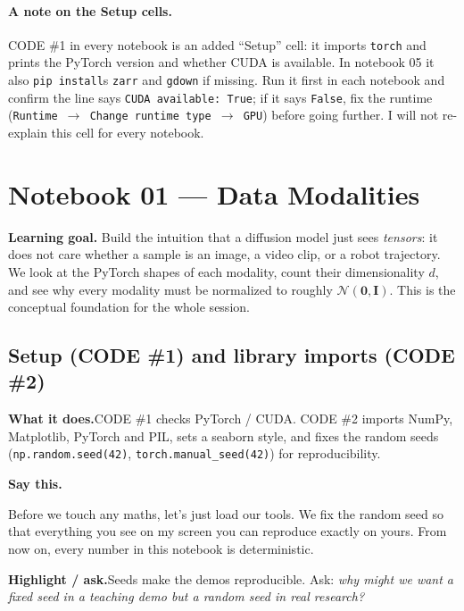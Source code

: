 \documentclass[11pt]{article}
\newenvironment{saythis}{%
  \par\smallskip\noindent
  \begin{list}{}{%
    \setlength{\leftmargin}{1.2em}%
    \setlength{\rightmargin}{0.5em}%
    \setlength{\topsep}{2pt}%
  }\item\relax
  \color{sayrule}\textbf{Say this.}\hspace{0.4em}\color{black}\itshape
}{%
  \end{list}\par\smallskip
}
\newcommand{\highlight}[1]{\par\smallskip\noindent\textcolor{hlcolor}{\textbf{Highlight / ask.}}\hspace{0.4em}#1\par\smallskip}
\newcommand{\whatdoes}[1]{\par\noindent\textbf{What it does.}\hspace{0.4em}#1\par}
\begin{document}
\paragraph{A note on the Setup cells.} CODE \#1 in every notebook is an added ``Setup'' cell:
it imports \texttt{torch} and prints the PyTorch version and whether CUDA is available. In notebook
05 it also \texttt{pip install}s \texttt{zarr} and \texttt{gdown} if missing. Run it first in each
notebook and confirm the line says \texttt{CUDA available: True}; if it says \texttt{False}, fix the
runtime (\texttt{Runtime $\to$ Change runtime type $\to$ GPU}) before going further. I will not
re-explain this cell for every notebook.

\section{Notebook 01 --- Data Modalities}

\textbf{Learning goal.} Build the intuition that a diffusion model just sees \emph{tensors}: it does
not care whether a sample is an image, a video clip, or a robot trajectory. We look at the PyTorch
shapes of each modality, count their dimensionality $d$, and see why every modality must be
normalized to roughly $\mathcal{N}(\mathbf{0}, \mathbf{I})$. This is the conceptual foundation for
the whole session.

\subsection{Setup (CODE \#1) and library imports (CODE \#2)}
\whatdoes{CODE \#1 checks PyTorch / CUDA. CODE \#2 imports NumPy, Matplotlib, PyTorch and PIL,
sets a seaborn style, and fixes the random seeds (\texttt{np.random.seed(42)},
\texttt{torch.manual\_seed(42)}) for reproducibility.}
\begin{saythis}
Before we touch any maths, let's just load our tools. We fix the random seed so that everything you
see on my screen you can reproduce exactly on yours. From now on, every number in this notebook is
deterministic.
\end{saythis}
\highlight{Seeds make the demos reproducible. Ask: \emph{why might we want a fixed seed in a teaching
demo but a random seed in real research?}}
\end{document}
